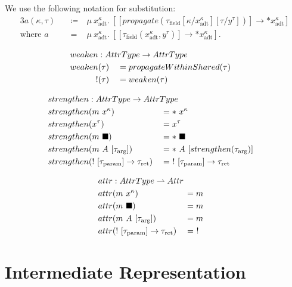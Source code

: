 We use the following notation for substitution:
\begin{alignat*}{3}
  a(\kappa, \tau)\ &&\coloneqq&\ \mu\ x^\kappa_\text{adt}.\ [[propagate(\tau_\text{field}[\kappa/x^\kappa_\text{adt}][\tau/y^\tau])] \to *x^\kappa_\text{adt}] \\
  \text{where } a &&=&\ \mu\ x^\kappa_\text{adt}.\ [[\tau_\text{field}(x^\kappa_\text{adt}, y^\tau)] \to *x^\kappa_\text{adt}].
\end{alignat*}

\begin{alignat*}{3}
  weaken &: \mathrlap{AttrType \to AttrType} \\
  weaken&(\tau) &&= propagateWithinShared(\tau) \\
  !&(\tau) &&= weaken(\tau)
\end{alignat*}

\begin{alignat*}{3}
  strengthen &: \mathrlap{AttrType \to AttrType} \\
  strengthen&(m\ x^\kappa) &&= *\ x^\kappa \\
  strengthen&(x^\tau) &&= x^\tau \\
  strengthen&(m\ \blacksquare) &&= *\ \blacksquare \\
  strengthen&(m\ A\ [\tau_\text{arg}]) &&= *\ A\ [strengthen(\tau_\text{arg})] \\
  strengthen&(!\ [\tau_\text{param}] \to \tau_\text{ret}) &&=\ !\ [\tau_\text{param}] \to \tau_\text{ret} \\
\end{alignat*}

\begin{alignat*}{3}
  attr &: \mathrlap{AttrType \rightharpoonup Attr} \\
  attr&(m\ x^\kappa) &&= m \\
  attr&(m\ \blacksquare) &&= m \\
  attr&(m\ A\ [\tau_\text{arg}]) &&= m \\
  attr&(!\ [\tau_\text{param}] \to \tau_\text{ret}) &&=\ ! \\
\end{alignat*}

\section{Intermediate Representation}

